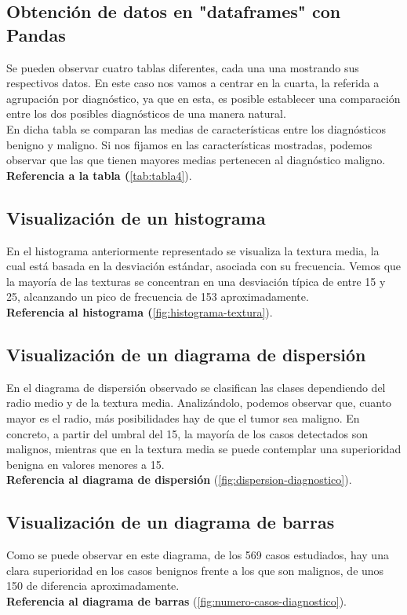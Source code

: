 \documentclass{llncs}
\begin{document}
\subsection{Obtención de datos en "dataframes" con Pandas}
{Se pueden observar cuatro tablas diferentes, cada una una mostrando sus respectivos datos. En este caso nos vamos a centrar en la cuarta, la referida a agrupación por diagnóstico, ya que en esta, es posible establecer una comparación entre los dos posibles diagnósticos de una manera natural.}\\
{En dicha tabla se comparan las medias de características entre los diagnósticos benigno y maligno. Si nos fijamos en las características mostradas, podemos observar que las que tienen mayores medias pertenecen al diagnóstico maligno.}\\
\textbf{Referencia a la tabla (}\ref{tab:tabla4}).

\subsection{Visualización de un histograma}
{En el histograma anteriormente representado se visualiza la textura media, la cual está basada en la desviación estándar, asociada con su frecuencia. Vemos que la mayoría de las texturas se concentran en una desviación típica de entre 15 y 25, alcanzando un pico de frecuencia de 153 aproximadamente.} \\
\textbf{Referencia al histograma (}\ref{fig:histograma-textura}).

\subsection{Visualización de un diagrama de dispersión}
{En el diagrama de dispersión observado se clasifican las clases dependiendo del radio medio y de la textura media. Analizándolo, podemos observar que, cuanto mayor es el radio, más posibilidades hay de que el tumor sea maligno. En concreto, a partir del umbral del 15, la mayoría de los casos detectados son malignos, mientras que en la textura media se puede contemplar una superioridad benigna en valores menores a 15.}\\
\textbf{Referencia al diagrama de dispersión }(\ref{fig:dispersion-diagnostico}).

\subsection{Visualización de un diagrama de barras}
{Como se puede observar en este diagrama, de los 569 casos estudiados, hay una clara superioridad en los casos benignos frente a los que son malignos, de unos 150 de diferencia aproximadamente.\\}
\textbf{Referencia al diagrama de barras }(\ref{fig:numero-casos-diagnostico}).
\end{document}
